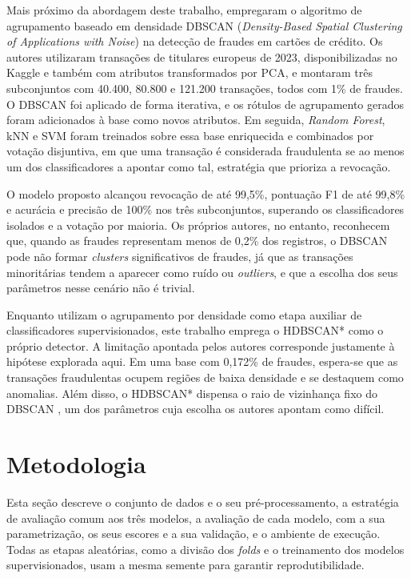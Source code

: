 \documentclass{uflamon}          %
\begin{document}
Mais próximo da abordagem deste trabalho,  empregaram o algoritmo de agrupamento baseado em densidade DBSCAN (\textit{Density-Based Spatial Clustering of Applications with Noise}) \cite{ester1996} na detecção de fraudes em cartões de crédito. Os autores utilizaram transações de titulares europeus de 2023, disponibilizadas no Kaggle e também com atributos transformados por PCA, e montaram três subconjuntos com 40.400, 80.800 e 121.200 transações, todos com 1\% de fraudes. O DBSCAN foi aplicado de forma iterativa, e os rótulos de agrupamento gerados foram adicionados à base como novos atributos. Em seguida, \textit{Random Forest}, kNN e SVM foram treinados sobre essa base enriquecida e combinados por votação disjuntiva, em que uma transação é considerada fraudulenta se ao menos um dos classificadores a apontar como tal, estratégia que prioriza a revocação.

O modelo proposto alcançou revocação de até 99,5\%, pontuação F1 de até 99,8\% e acurácia e precisão de 100\% nos três subconjuntos, superando os classificadores isolados e a votação por maioria. Os próprios autores, no entanto, reconhecem que, quando as fraudes representam menos de 0,2\% dos registros, o DBSCAN pode não formar \textit{clusters} significativos de fraudes, já que as transações minoritárias tendem a aparecer como ruído ou \textit{outliers}, e que a escolha dos seus parâmetros nesse cenário não é trivial.

Enquanto  utilizam o agrupamento por densidade como etapa auxiliar de classificadores supervisionados, este trabalho emprega o HDBSCAN* como o próprio detector. A limitação apontada pelos autores corresponde justamente à hipótese explorada aqui. Em uma base com 0,172\% de fraudes, espera-se que as transações fraudulentas ocupem regiões de baixa densidade e se destaquem como anomalias. Além disso, o HDBSCAN* dispensa o raio de vizinhança fixo do DBSCAN \cite{campello2015}, um dos parâmetros cuja escolha os autores apontam como difícil.


\chapter{Metodologia}
\label{cap:metodologia}

Esta seção descreve o conjunto de dados e o seu pré-processamento, a estratégia de avaliação comum aos três modelos, a avaliação de cada modelo, com a sua parametrização, os seus escores e a sua validação, e o ambiente de execução. Todas as etapas aleatórias, como a divisão dos \textit{folds} e o treinamento dos modelos supervisionados, usam a mesma semente para garantir reprodutibilidade.
\end{document}
